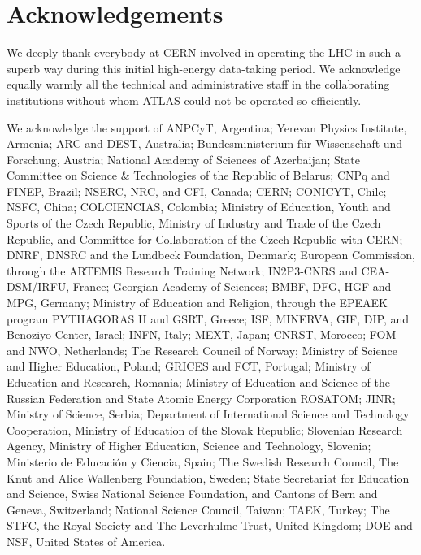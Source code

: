 \documentclass[11pt,a4paper,dvips]{article}
\begin{document}
\section{Acknowledgements}

We deeply thank everybody at CERN involved in operating the LHC in such a superb way during this initial high-energy data-taking period. We acknowledge equally warmly all the technical and administrative staff in the collaborating institutions without whom ATLAS could not be operated so efficiently. 

We acknowledge the support of ANPCyT, Argentina; Yerevan Physics Institute, Armenia; ARC and DEST, Australia; Bundesministerium f\"ur Wissenschaft und Forschung, Austria; National Academy of Sciences of Azerbaijan; State Committee on Science \& Technologies of the Republic of Belarus; CNPq and FINEP, Brazil; NSERC, NRC, and CFI, Canada; CERN; CONICYT, Chile; NSFC, China; COLCIENCIAS, Colombia; Ministry of Education, Youth and Sports of the Czech Republic, Ministry of Industry and Trade of the Czech Republic, and Committee for Collaboration of the Czech Republic with CERN; DNRF, DNSRC and the Lundbeck Foundation, Denmark; European Commission, through the ARTEMIS Research Training Network; IN2P3-CNRS and CEA-DSM/IRFU, France; Georgian Academy of Sciences; BMBF, DFG, HGF and MPG, Germany; Ministry of Education and Religion, through the EPEAEK program PYTHAGORAS II and GSRT, Greece; ISF, MINERVA, GIF, DIP, and Benoziyo Center, Israel; INFN, Italy; MEXT, Japan; CNRST, Morocco; FOM and NWO, Netherlands; The Research Council of Norway; Ministry of Science and Higher Education, Poland; GRICES and FCT, Portugal; Ministry of Education and Research, Romania; Ministry of Education and Science of the Russian Federation and State Atomic Energy Corporation ROSATOM; JINR; Ministry of Science, Serbia; Department of International Science and Technology Cooperation, Ministry of Education of the Slovak Republic; Slovenian Research Agency, Ministry of Higher Education, Science and Technology, Slovenia; Ministerio de Educaci\'{o}n y Ciencia, Spain; The Swedish Research Council, The Knut and Alice Wallenberg Foundation, Sweden; State Secretariat for Education and Science, Swiss National Science Foundation, and Cantons of Bern and Geneva, Switzerland; National Science Council, Taiwan; TAEK, Turkey; The STFC, the Royal Society and The Leverhulme Trust, United Kingdom; DOE and NSF, United States of America. 
\end{document}
